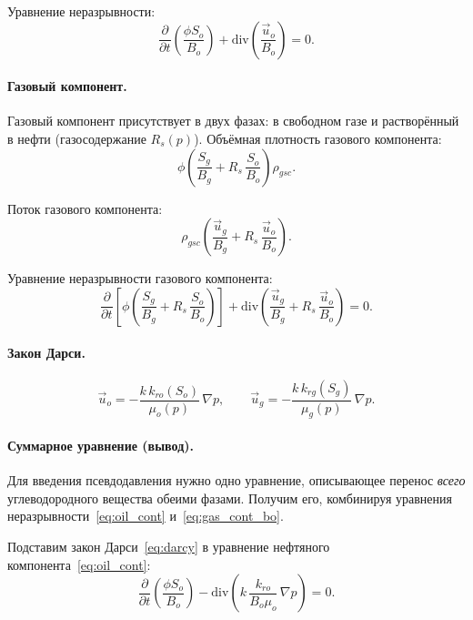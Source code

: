 ﻿\documentclass[12pt,a4paper]{article}
\begin{document}
Уравнение неразрывности:
\begin{equation}\label{eq:oil_cont}
  \frac{\partial}{\partial t}\left(\frac{\phi S_o}{B_o}\right)
  + \mathrm{div}\left(\frac{\vec{u}_o}{B_o}\right) = 0.
\end{equation}

\paragraph{Газовый компонент.}
Газовый компонент присутствует в двух фазах: в свободном газе и
растворённый в нефти (газосодержание $R_s(p)$). Объёмная плотность
газового компонента:
\begin{equation}\label{eq:gas_mass_bo}
  \phi\left(\frac{S_g}{B_g} + R_s\,\frac{S_o}{B_o}\right)\rho_{gsc}.
\end{equation}

Поток газового компонента:
\begin{equation}\label{eq:gas_flux_bo}
  \rho_{gsc}\left(\frac{\vec{u}_g}{B_g}
  + R_s\,\frac{\vec{u}_o}{B_o}\right).
\end{equation}

Уравнение неразрывности газового компонента:
\begin{equation}\label{eq:gas_cont_bo}
  \frac{\partial}{\partial t}\left[\phi\left(\frac{S_g}{B_g}
  + R_s\,\frac{S_o}{B_o}\right)\right]
  + \mathrm{div}\left(\frac{\vec{u}_g}{B_g}
  + R_s\,\frac{\vec{u}_o}{B_o}\right) = 0.
\end{equation}

\paragraph{Закон Дарси.}
\begin{equation}\label{eq:darcy}
  \vec{u}_o = -\frac{k\,k_{ro}(S_o)}{\mu_o(p)}\,\nabla p,
  \qquad
  \vec{u}_g = -\frac{k\,k_{rg}(S_g)}{\mu_g(p)}\,\nabla p.
\end{equation}

\paragraph{Суммарное уравнение (вывод).}
Для введения псевдодавления нужно одно уравнение, описывающее
перенос \emph{всего} углеводородного вещества обеими фазами.
Получим его, комбинируя уравнения
неразрывности~\eqref{eq:oil_cont} и~\eqref{eq:gas_cont_bo}.

Подставим закон Дарси~\eqref{eq:darcy} в уравнение
нефтяного компонента~\eqref{eq:oil_cont}:
\begin{equation}\label{eq:oil_pde}
  \frac{\partial}{\partial t}\left(\frac{\phi S_o}{B_o}\right)
  - \mathrm{div}\left(k\,\frac{k_{ro}}{B_o\mu_o}\,\nabla p\right)=0.
\end{equation}
\end{document}
